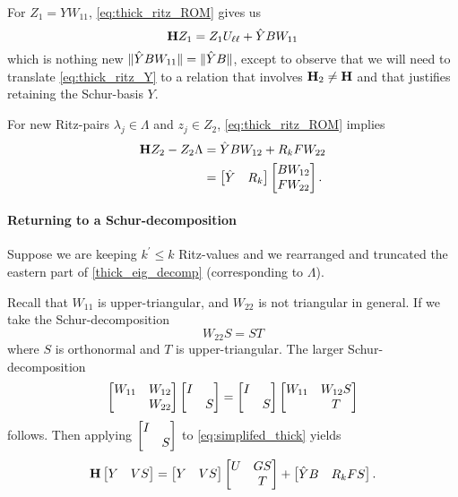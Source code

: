 For $Z_1 = Y W_{11}$, \eqref{eq:thick_ritz_ROM} gives us
\begin{equation}
\textbf{\textup{H}} Z_1 = Z_1 U_{\ell\ell} + \hat{Y} B W_{11}
\label{eq:thick_ritz_Y}
\end{equation}
which is nothing new $\|\hat{Y} B W_{11}\|=\|\hat{Y} B\|$, except to observe that we will need to translate \eqref{eq:thick_ritz_Y} to a relation that involves $\textbf{\textup{H}}_2 \neq \textbf{\textup{H}}$ and that justifies retaining the Schur-basis $Y$.

For new Ritz-pairs $\lambda_j\in\Lambda$ and $z_j\in Z_2$, \eqref{eq:thick_ritz_ROM} implies
\begin{equation}
\begin{aligned}
\textbf{\textup{H}} Z_2 - Z_2 \Lambda &=   \hat{Y} B W_{12} + R_k F W_{22}\\
&= \begin{bmatrix} \hat{Y} & R_k\end{bmatrix} \begin{bmatrix} B W_{12} \\F W_{22}\end{bmatrix}.
\end{aligned}
\label{eq:thick_ritz_V}
\end{equation}



\paragraph{Returning to a Schur-decomposition}
Suppose we are keeping $k^\prime\leq k$ Ritz-values and we  rearranged and truncated the eastern part of \eqref{thick_eig_decomp} (corresponding to $\Lambda$).  

Recall that $W_{11}$ is upper-triangular, and $W_{22}$ is not triangular in general. 
If we take the  Schur-decomposition 
\[
W_{22} S = S T
\]
where $S$ is orthonormal and $T$ is upper-triangular.  The
larger Schur-decomposition 
\begin{equation}
\begin{bmatrix} W_{11}&W_{12}\\&W_{22}\end{bmatrix}\begin{bmatrix} I&\\ &S\end{bmatrix} 
=
\begin{bmatrix} I&\\ &S\end{bmatrix} \begin{bmatrix} W_{11} &W_{12}S\\&T\end{bmatrix}
\label{eq:thick_schur_eigen}
\end{equation}
follows.  Then applying $\begin{bmatrix} I&\\ &S\end{bmatrix}$  to \eqref{eq:simplifed_thick} yields 
\begin{equation}
\textbf{\textup{H}} \begin{bmatrix} Y &V S \end{bmatrix} =  \begin{bmatrix} Y & V S\end{bmatrix}
\begin{bmatrix} U & G S \\ &T\end{bmatrix} +  \begin{bmatrix} \hat{Y} B & R_k F S\end{bmatrix}.
\label{eq:simplifed_thick_deflated_schur}
\end{equation}    




